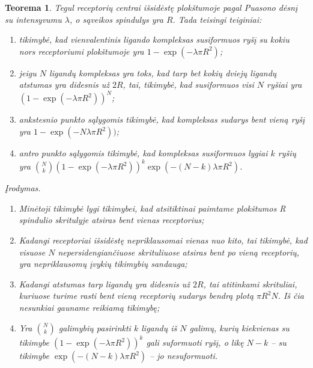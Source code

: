 \documentclass[10pt]{article}
\newtheorem{thm}{Teorema}
\begin{document}
\begin{thm}\label{thm:1}
Tegul receptorių centrai išsidėstę plokštumoje  pagal Puasono dėsnį su intensyvumu $\lambda$, o sąveikos spindulys yra $R$. Tada teisingi teiginiai:
\begin{enumerate}
	\item tikimybė, kad vienvalentinis ligando kompleksas susiformuos ryšį su kokiu nors receptoriumi plokštumoje yra $1-\exp(-\lambda \pi R^{2})$;
	\item jeigu $N$ ligandų kompleksas yra toks, kad tarp bet kokių dviejų ligandų atstumas  yra didesnis už $2R$, tai, tikimybė, kad susiformuos  visi $N$ ryšiai  yra $(1-\exp(-\lambda \pi R^{2}))^N$;
	\item ankstesnio punkto  sąlygomis  tikimybė, kad kompleksas  sudarys bent vieną ryšį yra 
	$1-\exp(-N \lambda \pi R^{2}))$;
	\item antro punkto sąlygomis tikimybė, kad kompleksas susiformuos lygiai $k$ ryšių yra 
	 $ \binom{N}{k} \left( 1-\exp(-\lambda \pi R^{2}) \right) ^ k \exp(-(N-k) \lambda \pi R^{2})  $. 
	
	
	
\end{enumerate}
Įrodymas. 
\begin{enumerate}
\item  Minėtoji tikimybė lygi tikimybei, kad atsitiktinai paimtame plokštumos   R spindulio skritulyje atsiras bent vienas receptorius;
\item Kadangi receptoriai išsidėstę nepriklausomai vienas nuo kito, tai tikimybė, kad  visuose $N$ nepersidengiančiuose skrituliuose atsiras bent po vieną receptorių, yra nepriklausomų įvykių tikimybių sandauga;
\item Kadangi atstumas tarp ligandų yra didesnis už $2R$, tai atitinkami skrituliai, kuriuose turime rasti bent vieną receptorių sudarys bendrą plotą $\pi R^2 N $. Iš čia nesunkiai gauname reikiamą tikimybę;
\item Yra  $\binom {N}{k}$ galimybių pasirinkti $k$ ligandų iš $N$ galimų,  kurių kiekvienas su tikimybe $\left( 1-\exp(-\lambda \pi R^{2}) \right) ^ k$ gali suformuoti ryšį, o likę $ N - k $ -- su tikimybe $\exp(-(N-k) \lambda \pi R^{2})$ -- jo nesuformuoti. 
\end{enumerate}


\end{thm}
\end{document}

